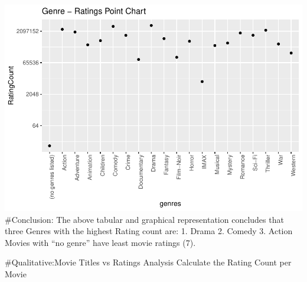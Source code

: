 \documentclass[
]{article}
\newenvironment{Shaded}{\begin{snugshade}}{\end{snugshade}}
\newcommand{\CommentTok}[1]{\textcolor[rgb]{0.56,0.35,0.01}{\textit{#1}}}
\newcommand{\DataTypeTok}[1]{\textcolor[rgb]{0.13,0.29,0.53}{#1}}
\newcommand{\DecValTok}[1]{\textcolor[rgb]{0.00,0.00,0.81}{#1}}
\newcommand{\KeywordTok}[1]{\textcolor[rgb]{0.13,0.29,0.53}{\textbf{#1}}}
\newcommand{\NormalTok}[1]{#1}
\newcommand{\OperatorTok}[1]{\textcolor[rgb]{0.81,0.36,0.00}{\textbf{#1}}}
\newcommand{\OtherTok}[1]{\textcolor[rgb]{0.56,0.35,0.01}{#1}}
\newcommand{\StringTok}[1]{\textcolor[rgb]{0.31,0.60,0.02}{#1}}
\begin{document}
\includegraphics{MovieLensProjectReport_files/figure-latex/genres Graphical Plot-1.pdf}
\#Conclusion: The above tabular and graphical representation concludes
that three Genres with the highest Rating count are: 1. Drama 2. Comedy
3. Action Movies with ``no genre'' have least movie ratings (7).

\#Qualitative:Movie Titles vs Ratings Analysis Calculate the Rating
Count per Movie

\begin{Shaded}
\end{Shaded}
\end{document}
